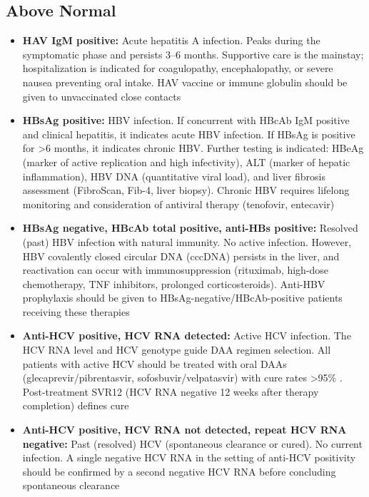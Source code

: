 \subsection*{Above Normal}
\begin{itemize}
  \item \textbf{HAV IgM positive:} Acute hepatitis A infection. Peaks during the symptomatic phase and persists 3--6 months. Supportive care is the mainstay; hospitalization is indicated for coagulopathy, encephalopathy, or severe nausea preventing oral intake. HAV vaccine or immune globulin should be given to unvaccinated close contacts \cite{nelson2019update}
  \item \textbf{HBsAg positive:} HBV infection. If concurrent with HBcAb IgM positive and clinical hepatitis, it indicates acute HBV infection. If HBsAg is positive for >6 months, it indicates chronic HBV. Further testing is indicated: HBeAg (marker of active replication and high infectivity), ALT (marker of hepatic inflammation), HBV DNA (quantitative viral load), and liver fibrosis assessment (FibroScan, Fib-4, liver biopsy). Chronic HBV requires lifelong monitoring and consideration of antiviral therapy (tenofovir, entecavir) \cite{terrault2018update}
  \item \textbf{HBsAg negative, HBcAb total positive, anti-HBs positive:} Resolved (past) HBV infection with natural immunity. No active infection. However, HBV covalently closed circular DNA (cccDNA) persists in the liver, and reactivation can occur with immunosuppression (rituximab, high-dose chemotherapy, TNF inhibitors, prolonged corticosteroids). Anti-HBV prophylaxis should be given to HBsAg-negative/HBcAb-positive patients receiving these therapies
  \item \textbf{Anti-HCV positive, HCV RNA detected:} Active HCV infection. The HCV RNA level and HCV genotype guide DAA regimen selection. All patients with active HCV should be treated with oral DAAs (glecaprevir/pibrentasvir, sofosbuvir/velpatasvir) with cure rates >95\% \cite{aasld2024hcv}. Post-treatment SVR12 (HCV RNA negative 12 weeks after therapy completion) defines cure
  \item \textbf{Anti-HCV positive, HCV RNA not detected, repeat HCV RNA negative:} Past (resolved) HCV (spontaneous clearance or cured). No current infection. A single negative HCV RNA in the setting of anti-HCV positivity should be confirmed by a second negative HCV RNA before concluding spontaneous clearance
\end{itemize}


